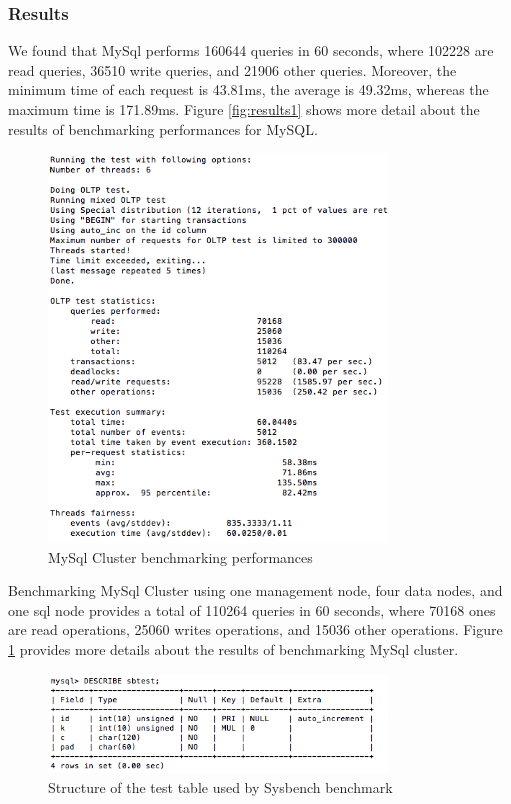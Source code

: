 \documentclass[10pt, conference]{IEEEtran}
\begin{document}
\subsubsection{Results} We found that MySql performs 160644 queries in 60 seconds, where 102228 are read queries, 36510 write queries, and 21906 other queries. Moreover, the minimum time of each request is 43.81ms, the average is 49.32ms, whereas the maximum time is 171.89ms. Figure \ref{fig:results1} shows more detail about the results of benchmarking performances for MySQL.

\begin{figure}[h!]
	\centering
	\includegraphics[width=9cm]{results2.png}
	\caption{MySql Cluster benchmarking performances}
	\label{fig:results2}
\end{figure} 

Benchmarking MySql Cluster using one management node, four data nodes, and one sql node provides a total of 110264 queries in 60 seconds, where 70168 ones are read operations, 25060 writes operations, and 15036 other operations. Figure \ref{fig:results2} provides more details about the results of benchmarking MySql cluster.


\begin{figure}[h!]
	\centering
	\includegraphics[width=9cm]{sbtestStructure.png}
	\caption{Structure of the test table used by Sysbench benchmark}
	\label{fig:sbtestStructure}
\end{figure} 
\end{document}
